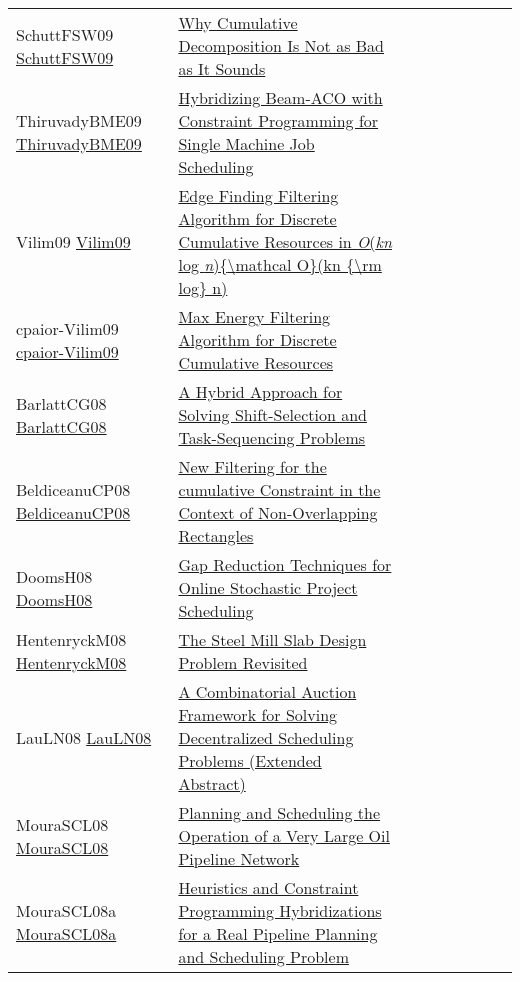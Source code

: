 {\begin{longtable}{p{3cm}p{7cm}lllllll}
SchuttFSW09 \href{https://doi.org/10.1007/978-3-642-04244-7\_58}{SchuttFSW09} &  \href{papers/SchuttFSW09.pdf}{Why Cumulative Decomposition Is Not as Bad as It Sounds} &  &  &  &  &  &  & \\
ThiruvadyBME09 \href{https://doi.org/10.1007/978-3-642-04918-7\_3}{ThiruvadyBME09} &  \href{papers/ThiruvadyBME09.pdf}{Hybridizing Beam-ACO with Constraint Programming for Single Machine Job Scheduling} &  &  &  &  &  &  & \\
Vilim09 \href{https://doi.org/10.1007/978-3-642-04244-7\_62}{Vilim09} &  \href{papers/Vilim09.pdf}{Edge Finding Filtering Algorithm for Discrete Cumulative Resources in \emph{O}(\emph{kn} log \emph{n})\{{\textbackslash}mathcal O\}(kn \{{\textbackslash}rm log\} n)} &  &  &  &  &  &  & \\
cpaior-Vilim09 \href{https://doi.org/10.1007/978-3-642-01929-6\_22}{cpaior-Vilim09} &  \href{papers/cpaior-Vilim09.pdf}{Max Energy Filtering Algorithm for Discrete Cumulative Resources} &  &  &  &  &  &  & \\
BarlattCG08 \href{https://doi.org/10.1007/978-3-540-68155-7\_24}{BarlattCG08} &  \href{papers/BarlattCG08.pdf}{A Hybrid Approach for Solving Shift-Selection and Task-Sequencing Problems} &  &  &  &  &  &  & \\
BeldiceanuCP08 \href{https://doi.org/10.1007/978-3-540-68155-7\_5}{BeldiceanuCP08} &  \href{papers/BeldiceanuCP08.pdf}{New Filtering for the cumulative Constraint in the Context of Non-Overlapping Rectangles} &  &  &  &  &  &  & \\
DoomsH08 \href{https://doi.org/10.1007/978-3-540-68155-7\_8}{DoomsH08} &  \href{papers/DoomsH08.pdf}{Gap Reduction Techniques for Online Stochastic Project Scheduling} &  &  &  &  &  &  & \\
HentenryckM08 \href{https://doi.org/10.1007/978-3-540-68155-7\_41}{HentenryckM08} &  \href{papers/HentenryckM08.pdf}{The Steel Mill Slab Design Problem Revisited} &  &  &  &  &  &  & \\
LauLN08 \href{https://doi.org/10.1007/978-3-540-68155-7\_33}{LauLN08} &  \href{papers/LauLN08.pdf}{A Combinatorial Auction Framework for Solving Decentralized Scheduling Problems (Extended Abstract)} &  &  &  &  &  &  & \\
MouraSCL08 \href{https://doi.org/10.1007/978-3-540-85958-1\_3}{MouraSCL08} &  \href{papers/MouraSCL08.pdf}{Planning and Scheduling the Operation of a Very Large Oil Pipeline Network} &  &  &  &  &  &  & \\
MouraSCL08a \href{https://doi.org/10.1109/CSE.2008.24}{MouraSCL08a} &  \href{papers/MouraSCL08a.pdf}{Heuristics and Constraint Programming Hybridizations for a Real Pipeline Planning and Scheduling Problem} &  &  &  &  &  &  & \\

\end{longtable}}

